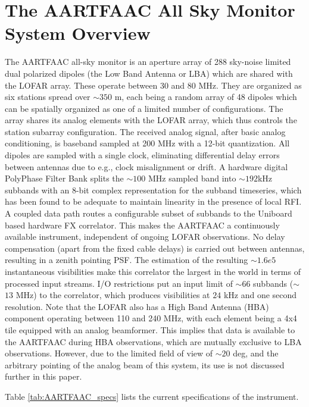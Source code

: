 \documentclass{aa}
\begin{document}
\section{\label{sec:The-AARTFAAC-All}The AARTFAAC All Sky Monitor System
Overview} The  AARTFAAC all-sky  monitor is an  aperture array of  288 sky-noise
limited dual  polarized dipoles (the Low  Band Antenna or LBA)  which are shared
with the LOFAR  array. These operate between 30 and 80  MHz.  They are organized
as  six stations spread  over $\sim$$350$  m, each  being a  random array  of 48
dipoles  which  can  be spatially  organized  as  one  of  a limited  number  of
configurations. The array shares its analog elements with the LOFAR array, which
thus controls  the station subarray  configuration. The received  analog signal,
after basic  analog conditioning, is baseband  sampled at 200 MHz  with a 12-bit
quantization.   All  dipoles  are  sampled  with  a  single  clock,  eliminating
differential delay  errors between antennas  due to e.g., clock  misalignment or
drift.   A hardware  digital PolyPhase  Filter Bank  splits the  $\sim$$100$ MHz
sampled band  into $\sim$$192$kHz subbands with an  8-bit complex representation
for the  subband timeseries,  which has  been found to  be adequate  to maintain
linearity  in  the  presence  of  local  RFI.  A  coupled  data  path  routes  a
configurable   subset  of   subbands   to  the   Uniboard   based  hardware   FX
correlator.  This  makes  the  AARTFAAC  a  continuously  available  instrument,
independent of ongoing LOFAR observations. No delay compensation (apart from the
fixed  cable delays)  is carried  out between  antennas, resulting  in  a zenith
pointing  PSF. The  estimation  of  the  resulting  $\sim$$1.6e5$  instantaneous
visibilities make this correlator the largest in the world in terms of processed
input  streams. I/O  restrictions  put  an input  limit  of $\sim$$66$  subbands
($\sim$$13$ MHz) to the correlator,  which produces visibilities at $24$ kHz and
one second  resolution. Note that the LOFAR  also has a High  Band Antenna (HBA)
component operating between 110 and 240  MHz, with each element being a 4x4 tile
equipped with an  analog beamformer. This implies that data  is available to the
AARTFAAC  during   HBA  observations,  which  are  mutually   exclusive  to  LBA
observations.  However, due to the limited  field of view of $\sim$$20$ deg, and
the  arbitrary pointing  of  the analog  beam of  this  system, its  use is  not
discussed further in this paper.

Table \ref{tab:AARTFAAC_specs} lists the current specifications of
the instrument. 
\end{document}
